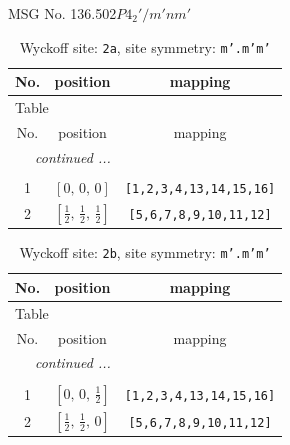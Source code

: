 \documentclass[fleqn,8pt]{jsarticle}
\begin{document}
\setcounter{MaxMatrixCols}{32}

\renewcommand{\tablename}{Table~}
\renewcommand{\figurename}{Figure~}
\begin{center}
\LARGE
MSG No. 136.502\quad$P4_{2}'/m'nm'$
\end{center}
\renewcommand{\arraystretch}{1.2}
\begin{longtable}{ccc}
\caption{Wyckoff site: {\tt 2a}, site symmetry: {\tt m'.m'm'}}
 \\
 \hline \hline
No. & position & mapping \\ \hline \endfirsthead

\multicolumn{2}{l}{\tablename\ \thetable{}} \\
 \hline \hline
No. & position & mapping \\ \hline \endhead

 \hline \hline
\multicolumn{2}{r}{\footnotesize\it continued ...} \\ \endfoot

 \hline \hline
\multicolumn{2}{r}{} \\ \endlastfoot

1 & $\left[ 0,\, 0,\, 0 \right]$ & {\tt [1,2,3,4,13,14,15,16]} \\ \hline
2 & $\left[ \frac{1}{2},\, \frac{1}{2},\, \frac{1}{2} \right]$ & {\tt [5,6,7,8,9,10,11,12]} \\
\end{longtable}
\renewcommand{\arraystretch}{1.2}
\begin{longtable}{ccc}
\caption{Wyckoff site: {\tt 2b}, site symmetry: {\tt m'.m'm'}}
 \\
 \hline \hline
No. & position & mapping \\ \hline \endfirsthead

\multicolumn{2}{l}{\tablename\ \thetable{}} \\
 \hline \hline
No. & position & mapping \\ \hline \endhead

 \hline \hline
\multicolumn{2}{r}{\footnotesize\it continued ...} \\ \endfoot

 \hline \hline
\multicolumn{2}{r}{} \\ \endlastfoot

1 & $\left[ 0,\, 0,\, \frac{1}{2} \right]$ & {\tt [1,2,3,4,13,14,15,16]} \\ \hline
2 & $\left[ \frac{1}{2},\, \frac{1}{2},\, 0 \right]$ & {\tt [5,6,7,8,9,10,11,12]} \\
\end{longtable}
\end{document}
